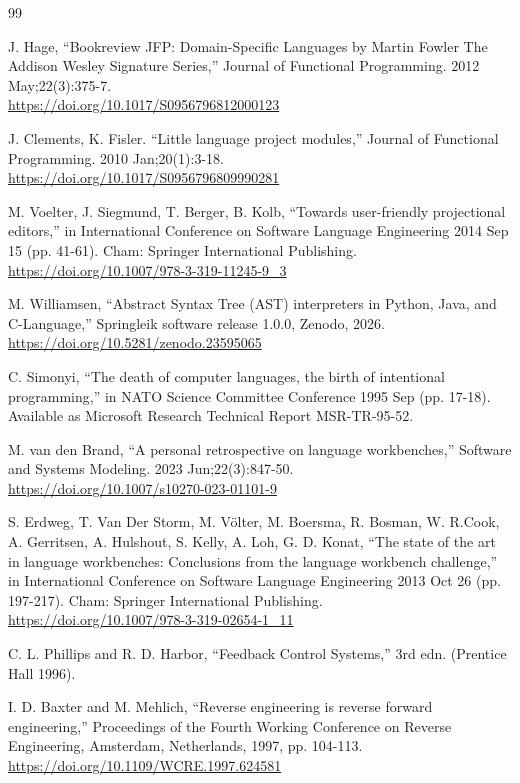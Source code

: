 \documentclass[a4paper,10pt]{article}
\begin{document}
\begin{thebibliography}{99}

J. Hage, ``Bookreview JFP: Domain-Specific Languages by Martin Fowler The Addison Wesley Signature Series,'' Journal of Functional Programming. 2012 May;22(3):375-7. \\
\url{https://doi.org/10.1017/S0956796812000123}

J. Clements, K. Fisler. ``Little language project modules,'' Journal of Functional Programming. 2010 Jan;20(1):3-18. \\
\url{https://doi.org/10.1017/S0956796809990281}

M. Voelter, J. Siegmund, T. Berger, B. Kolb, ``Towards user-friendly projectional editors,'' in International Conference on Software Language Engineering 2014 Sep 15 (pp. 41-61). Cham: Springer International Publishing. \\
\url{https://doi.org/10.1007/978-3-319-11245-9_3}

M. Williamsen, ``Abstract Syntax Tree (AST) interpreters in Python, Java, and C-Language,''
Springleik software release 1.0.0, Zenodo, 2026. \\
\url{https://doi.org/10.5281/zenodo.23595065}

C. Simonyi, ``The death of computer languages, the birth of intentional programming,'' in NATO Science Committee Conference 1995 Sep (pp. 17-18). Available as Microsoft Research Technical Report MSR-TR-95-52.

M. van den Brand, ``A personal retrospective on language workbenches,'' Software and Systems Modeling. 2023 Jun;22(3):847-50. \\
\url{https://doi.org/10.1007/s10270-023-01101-9}

S. Erdweg, T. Van Der Storm, M. Völter, M. Boersma, R. Bosman, W. R.Cook, A. Gerritsen, A. Hulshout, S. Kelly, A. Loh, G. D. Konat, ``The state of the art in language workbenches: Conclusions from the language workbench challenge,'' in International Conference on Software Language Engineering 2013 Oct 26 (pp. 197-217). Cham: Springer International Publishing. \\
\url{https://doi.org/10.1007/978-3-319-02654-1_11}

C. L. Phillips and R. D. Harbor, ``Feedback Control Systems,'' 3rd edn. (Prentice Hall 1996).

I. D. Baxter and M. Mehlich, ``Reverse engineering is reverse forward engineering,'' Proceedings of the Fourth Working Conference on Reverse Engineering, Amsterdam, Netherlands, 1997, pp. 104-113. \\
\url{https://doi.org/10.1109/WCRE.1997.624581}


\end{thebibliography}
\end{document}
